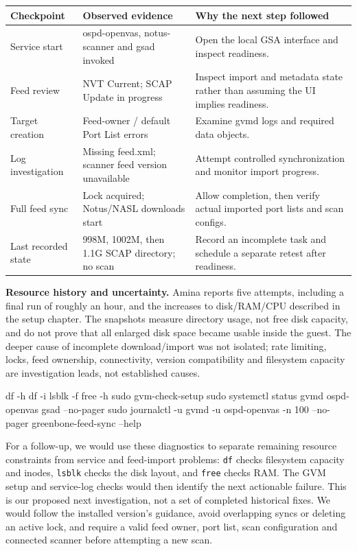 \documentclass[11pt,a4paper]{article}
\begin{document}
\begin{tabularx}{\linewidth}{@{}L{3.4cm}X X@{}}
\toprule
\textbf{Checkpoint} & \textbf{Observed evidence} & \textbf{Why the next step followed}\\
\midrule
Service start & ospd-openvas, notus-scanner and gsad invoked & Open the local GSA interface and inspect readiness.\\
Feed review & NVT Current; SCAP Update in progress & Inspect import and metadata state rather than assuming the UI implies readiness.\\
Target creation & Feed-owner / default Port List errors & Examine gvmd logs and required data objects.\\
Log investigation & Missing feed.xml; scanner feed version unavailable & Attempt controlled synchronization and monitor import progress.\\
Full feed sync & Lock acquired; Notus/NASL downloads start & Allow completion, then verify actual imported port lists and scan configs.\\
Last recorded state & 998M, 1002M, then 1.1G SCAP directory; no scan & Record an incomplete task and schedule a separate retest after readiness.\\
\bottomrule
\end{tabularx}

\textbf{Resource history and uncertainty.} Amina reports five attempts, including a final run of roughly an hour, and the increases to disk/RAM/CPU described in the setup chapter. The snapshots measure directory usage, not free disk capacity, and do not prove that all enlarged disk space became usable inside the guest. The deeper cause of incomplete download/import was not isolated; rate limiting, locks, feed ownership, connectivity, version compatibility and filesystem capacity are investigation leads, not established causes.

\begin{cmdbox}
\begin{reportcode}
df -h
df -i
lsblk -f
free -h
sudo gvm-check-setup
sudo systemctl status gvmd ospd-openvas gsad --no-pager
sudo journalctl -u gvmd -u ospd-openvas -n 100 --no-pager
greenbone-feed-sync --help
\end{reportcode}
\end{cmdbox}
For a follow-up, we would use these diagnostics to separate remaining resource constraints from service and feed-import problems: \texttt{df} checks filesystem capacity and inodes, \texttt{lsblk} checks the disk layout, and \texttt{free} checks RAM. The GVM setup and service-log checks would then identify the next actionable failure. This is our proposed next investigation, not a set of completed historical fixes. We would follow the installed version's guidance, avoid overlapping syncs or deleting an active lock, and require a valid feed owner, port list, scan configuration and connected scanner before attempting a new scan.
\end{document}
